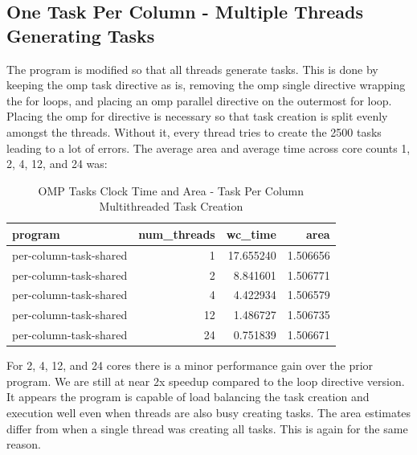 \documentclass{article}
\begin{document}
\subsection{One Task Per Column - Multiple Threads Generating Tasks}
The program is modified so that all threads generate tasks. This is done by 
keeping the omp task directive as is, removing the omp single directive wrapping the for loops, 
and placing an omp parallel directive on the outermost for loop. Placing the omp for directive is necessary 
so that task creation is split evenly amongst the threads. Without it, every thread tries to create the 2500 tasks 
leading to a lot of errors. The average area and average time across core counts 1, 2, 4, 12, and 24 was:
\begin{table}[H]
    \centering
    \caption{OMP Tasks Clock Time and Area - Task Per Column Multithreaded Task Creation}
    \fontsize{12}{14}\selectfont
    \begin{tabular}[t]{l|r|r|r}
    \hline
    program & num\_threads & wc\_time & area\\
    \hline
    per-column-task-shared & 1 & 17.655240 & 1.506656\\
    \hline
    per-column-task-shared & 2 & 8.841601 & 1.506771\\
    \hline
    per-column-task-shared & 4 & 4.422934 & 1.506579\\
    \hline
    per-column-task-shared & 12 & 1.486727 & 1.506735\\
    \hline
    per-column-task-shared & 24 & 0.751839 & 1.506671\\
    \hline
    \end{tabular}
\end{table}
\noindent For 2, 4, 12, and 24 cores there is a minor performance gain over the prior program. 
We are still at near 2x speedup compared to the loop directive version. It appears the program is 
capable of load balancing the task creation and execution well even when threads are also busy creating tasks. The area 
estimates differ from when a single thread was creating all tasks. This is again for the same reason.
\end{document}
